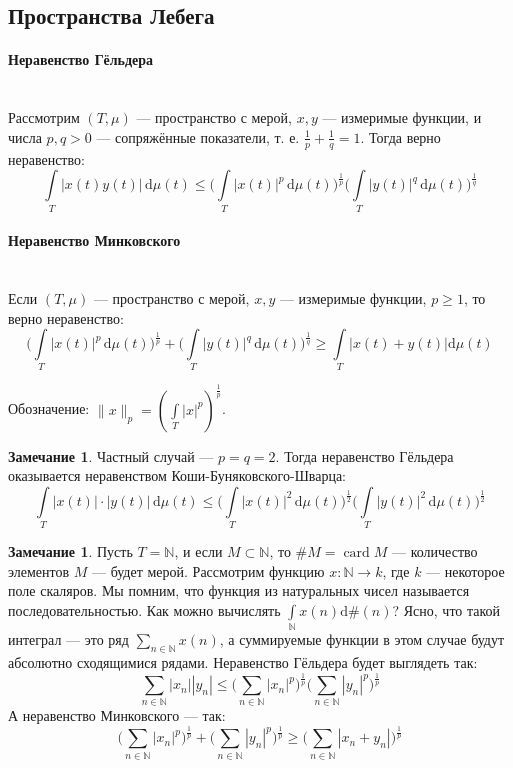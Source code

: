 \documentclass[11pt,openany,a4paper]{scrartcl}
\theoremstyle{plain}
\theoremstyle{definition}
\newtheorem{remark}[theorem]{Замечание}
\newcommand\mb{\mathbb}
\newcommand\lparagraph[1]{\paragraph{#1}\mbox{}\\}
\newcommand{\dif}{\, \mathrm d}
\DeclareMathOperator{\card}{card}
\begin{document}
\subsection{Пространства Лебега}

\lparagraph{Неравенство Гёльдера}

Рассмотрим $(T, \mu)$ — пространство с мерой, $x, y$ — измеримые функции, и числа
$p, q > 0$ — сопряжённые показатели, т. е. $\frac{1}{p} + \frac{1}{q} = 1$. 
Тогда верно неравенство:
$$
\int\limits_T |x(t)y(t)|\dif \mu(t) \leqslant
\bigg(\int\limits_T |x(t)|^p\dif \mu(t)\bigg)^{\frac{1}{p}}
\bigg(\int\limits_T |y(t)|^q\dif \mu(t)\bigg)^\frac{1}{q}
$$

\lparagraph{Неравенство Минковского}

Если $(T, \mu)$ — пространство с мерой, $x, y$ — измеримые функции,
$p \geqslant 1$, то верно неравенство:
$$
\bigg(\int\limits_T |x(t)|^p\dif \mu(t)\bigg)^{\frac{1}{p}} +
\bigg(\int\limits_T |y(t)|^q\dif \mu(t)\bigg)^\frac{1}{q} \geqslant
\int\limits_T |x(t) + y(t)|\mathrm d\mu(t)
$$

Обозначение: $\|x\|_p = (\int\limits_T |x|^p)^\frac{1}{p}$.

\begin{remark}
    Частный случай — $p = q = 2$. Тогда неравенство Гёльдера оказывается
    неравенством Коши-Буняковского-Шварца:
    $$
    \int\limits_T |x(t)|\cdot|y(t)|\dif \mu(t) \leqslant
    \bigg(\int\limits_T |x(t)|^2\dif \mu(t)\bigg)^{\frac{1}{2}}
    \bigg(\int\limits_T |y(t)|^2\dif\mu(t)\bigg)^\frac{1}{2}
    $$
\end{remark}
\begin{remark}
    Пусть $T = \mb N$, и если $M \subset \mb N$,
    то $\#M = \card M$ — количество элементов $M$ — будет мерой.
    Рассмотрим функцию $x: \mb N \to k$, где $k$ — некоторое поле скаляров.
    Мы помним, что функция из натуральных чисел называется последовательностью.
    Как можно вычислять $\int\limits_{\mb N}x(n)\mathrm d\#(n)$? Ясно,
    что такой интеграл — это ряд $\sum\limits_{n \in \mb N} x(n)$, а суммируемые 
    функции в этом случае будут абсолютно сходящимися рядами.
    Неравенство Гёльдера будет выглядеть так:
    $$
    \sum_{n \in \mb N} |x_n||y_n| \leqslant
    \bigg(\sum_{n \in \mb N} |x_n|^p\bigg)^\frac{1}{p}
    \bigg(\sum_{n \in \mb N} |y_n|^p\bigg)^\frac{1}{p}
    $$
    А неравенство Минковского — так:
    $$
    \bigg(\sum_{n \in \mb N} |x_n|^p\bigg)^\frac{1}{p} +
    \bigg(\sum_{n \in \mb N} |y_n|^p\bigg)^\frac{1}{p} \geqslant
    \bigg(\sum_{n \in \mb N} |x_n + y_n|\bigg)^\frac{1}{p}
    $$
\end{remark}
\end{document}
